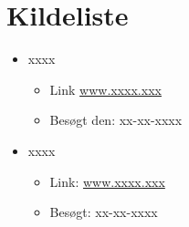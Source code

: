 \section{Kildeliste}

\begin{itemize}[noitemsep]
  \item xxxx
  \begin{itemize}[noitemsep]
    \item Link \url{www.xxxx.xxx}
    \item Besøgt den: xx-xx-xxxx
  \end{itemize}

  \item xxxx
	\begin{itemize} [noitemsep]
	\item Link: \url{www.xxxx.xxx}
	\item Besøgt: xx-xx-xxxx
\end{itemize}


 
\end{itemize}


